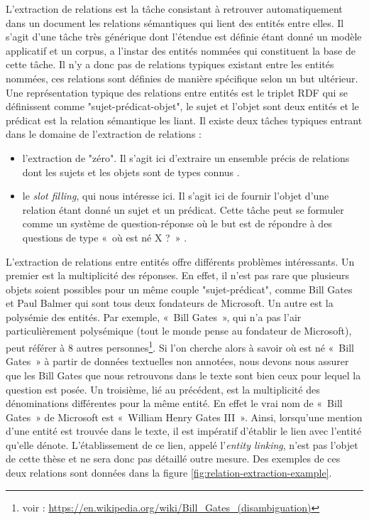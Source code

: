 \documentclass[PhD-Yoann-Dupont.tex]{subfiles}
\begin{document}
L'extraction de relations est la tâche consistant à retrouver automatiquement dans un document les relations sémantiques qui lient des entités entre elles. Il s'agit d'une tâche très générique dont l'étendue est définie étant donné un modèle applicatif et un corpus, a l'instar des entités nommées qui constituent la base de cette tâche. Il n'y a donc pas de relations typiques existant entre les entités nommées, ces relations sont définies de manière spécifique selon un but ultérieur. Une représentation typique des relations entre entités est le triplet RDF \citep{lassila1998resource} qui se définissent comme "sujet-prédicat-objet", le sujet et l'objet sont deux entités et le prédicat est la relation sémantique les liant.
Il existe deux tâches typiques entrant dans le domaine de l'extraction de relations :

\begin{itemize}
\item l'extraction de "zéro". Il s'agit ici d'extraire un ensemble précis de relations dont les sujets et les objets sont de types connus \citep{krallinger2008overview,wei2016assessing}.
\item le \textit{slot filling}, qui nous intéresse ici. Il s'agit ici de fournir l'objet d'une relation étant donné un sujet et un prédicat. Cette tâche peut se formuler comme un système de question-réponse où le but est de répondre à des questions de type «\ où est né X ?\ » \citep{surdeanu2013overview,surdeanu2014overview}.
\end{itemize}

L'extraction de relations entre entités offre différents problèmes intéressants. Un premier est la multiplicité des réponses. En effet, il n'est pas rare que plusieurs objets soient possibles pour un même couple "sujet-prédicat", comme Bill Gates et Paul Balmer qui sont tous deux fondateurs de Microsoft. Un autre est la polysémie des entités. Par exemple, «\ Bill Gates\ », qui n'a pas l'air particulièrement polysémique (tout le monde pense au fondateur de Microsoft), peut référer à 8 autres personnes\footnote{voir : \url{https://en.wikipedia.org/wiki/Bill_Gates_(disambiguation)}}. Si l'on cherche alors à savoir où est né «\ Bill Gates\ » à partir de données textuelles non annotées, nous devons nous assurer que les Bill Gates que nous retrouvons dans le texte sont bien ceux pour lequel la question est posée.  Un troisième, lié au précédent, est la multiplicité des dénominations différentes pour la même entité. En effet le vrai nom de «\ Bill Gates\ » de Microsoft est «\ William Henry Gates III\ ». Ainsi, lorsqu'une mention d'une entité est trouvée dans le texte, il est impératif d'établir le lien avec l'entité qu'elle dénote. L'établissement de ce lien, appelé l'\textit{entity linking}, n'est pas l'objet de cette thèse et ne sera donc pas détaillé outre mesure. Des exemples de ces deux relations sont données dans la figure \ref{fig:relation-extraction-example}.
\end{document}
